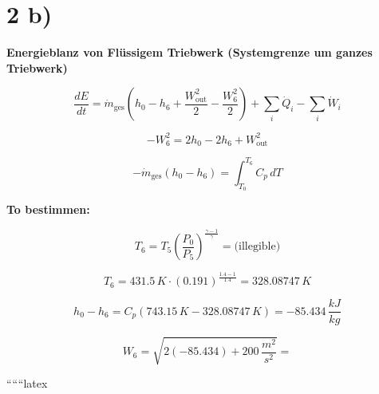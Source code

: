 \section*{2 b)}

\textbf{Energieblanz von Fl\"ussigem Triebwerk (Systemgrenze um ganzes Triebwerk)}

\[
\frac{dE}{dt} = \dot{m}_\text{ges} \left( h_0 - h_6 + \frac{W_\text{out}^2}{2} - \frac{W_6^2}{2} \right) + \sum_i \dot{Q}_i - \sum_i \dot{W}_i
\]

\[
- W_6^2 = 2 h_0 - 2 h_6 + W_\text{out}^2
\]

\[
- \dot{m}_\text{ges} \left( h_0 - h_6 \right) = \int_{T_0}^{T_6} C_p \, dT
\]

\textbf{To bestimmen:}

\[
T_6 = T_5 \left( \frac{P_0}{P_5} \right)^{\frac{\gamma - 1}{\gamma}} = \text{(illegible)}
\]

\[
T_6 = 431.5 \, K \cdot \left( 0.191 \right)^{\frac{1.4 - 1}{1.4}} = 328.08747 \, K
\]

\[
h_0 - h_6 = C_p \left( 743.15 \, K - 328.08747 \, K \right) = -85.434 \, \frac{kJ}{kg}
\]

\[
W_6 = \sqrt{2 \left( -85.434 \right) + 200 \, \frac{m^2}{s^2}} = 
\]

``````latex